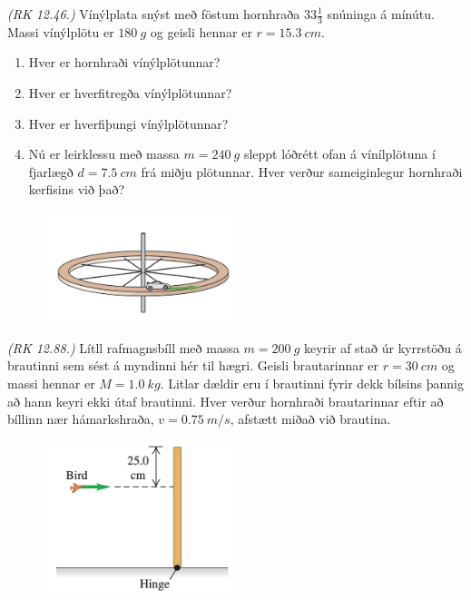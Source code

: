 \ifdefined \wholebook \else\documentclass[oneside]{book}\usepackage{EdlBook}\graphicspath{{figures/}}
\begin{document}
\begin{enumerate}[label = \textbf{Dæmi \thechapter.\arabic*.}]
\item \textit{(RK 12.46.)} Vínýlplata snýst með föstum hornhraða $33 \frac{1}{3}$ snúninga á mínútu. Massi vínýlplötu er $\SI{180}{g}$ og geisli hennar er $r = \SI{15.3}{cm}$.
\begin{enumerate}[label = \textbf{(\alph*)}]
    \item Hver er hornhraði vínýlplötunnar?
    \item Hver er hverfitregða vínýlplötunnar?
    \item Hver er hverfiþungi vínýlplötunnar?
    \item Nú er leirklessu með massa $m = \SI{240}{g}$ sleppt lóðrétt ofan á vínílplötuna í fjarlægð $d = \SI{7.5}{cm}$ frá miðju plötunnar. Hver verður sameiginlegur hornhraði kerfisins við það?
\end{enumerate}

\begin{minipage}{\linewidth}

\begin{figure}
\vspace{-1.25cm}
\includegraphics[width=2.2in]{images/bilahverfi.png}
\end{figure}

\item \textit{(RK 12.88.)} Lítll rafmagnsbíll með massa $m = \SI{200}{g}$ keyrir af stað úr kyrrstöðu á brautinni sem sést á myndinni hér til hægri. Geisli brautarinnar er $r = \SI{30}{cm}$ og massi hennar er $M = \SI{1.0}{kg}$. Litlar dældir eru í brautinni fyrir dekk bílsins þannig að hann keyri ekki útaf brautinni. Hver verður hornhraði brautarinnar eftir að bíllinn nær hámarkshraða, $v = \SI{0.75}{m/s}$, afstætt miðað við brautina.

\end{minipage}

\vspace{0.5cm}

\begin{minipage}{\linewidth}
\begin{figure}
\vspace{-1.25cm}
\includegraphics[width=2.2in]{images/fugl.png}
\end{figure}


\end{minipage}
\end{enumerate}
\end{document}
